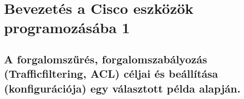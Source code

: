 \section{Bevezetés a Cisco eszközök programozásába 1}
\subsection{A forgalomszűrés, forgalomszabályozás (Trafficfiltering, ACL) céljai és beállítása (konfigurációja) egy választott példa alapján.}
